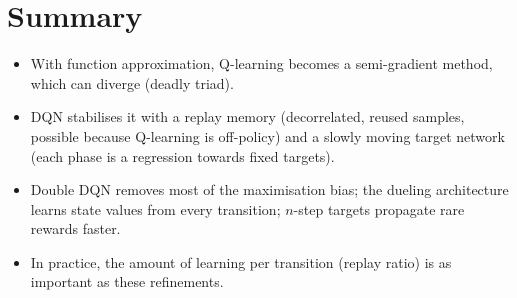 \section{Summary}

\begin{itemize}[nosep]
  \item With function approximation, Q-learning becomes a semi-gradient
    method, which can diverge (deadly triad).
  \item DQN stabilises it with a replay memory (decorrelated, reused
    samples, possible because Q-learning is off-policy) and a slowly moving
    target network (each phase is a regression towards fixed targets).
  \item Double DQN removes most of the maximisation bias; the dueling
    architecture learns state values from every transition; $n$-step
    targets propagate rare rewards faster.
  \item In practice, the amount of learning per transition (replay ratio)
    is as important as these refinements.
\end{itemize}
